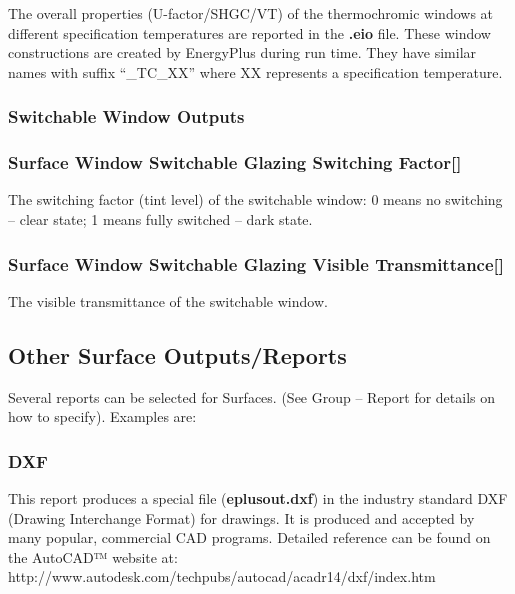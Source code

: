 The overall properties (U-factor/SHGC/VT) of the thermochromic windows at different specification temperatures are reported in the \textbf{.eio} file. These window constructions are created by EnergyPlus during run time. They have similar names with suffix ``\_TC\_XX'' where XX represents a specification temperature.

\subsubsection{Switchable Window Outputs}\label{switchable-window-outputs}

\subsubsection{Surface Window Switchable Glazing Switching Factor{[]}}\label{surface-window-switchable-glazing-switching-factor}

The switching factor (tint level) of the switchable window: 0 means no switching -- clear state; 1 means fully switched -- dark state.

\subsubsection{Surface Window Switchable Glazing Visible Transmittance{[]}}\label{surface-window-switchable-glazing-visible-transmittance}

The visible transmittance of the switchable window.

\subsection{Other Surface Outputs/Reports}\label{other-surface-outputsreports}

Several reports can be selected for Surfaces. (See Group -- Report for details on how to specify). Examples are:

\subsubsection{DXF}\label{dxf}

This report produces a special file (\textbf{eplusout.dxf}) in the industry standard DXF (Drawing Interchange Format) for drawings. It is produced and accepted by many popular, commercial CAD programs. Detailed reference can be found on the AutoCAD™ website at: http://www.autodesk.com/techpubs/autocad/acadr14/dxf/index.htm


